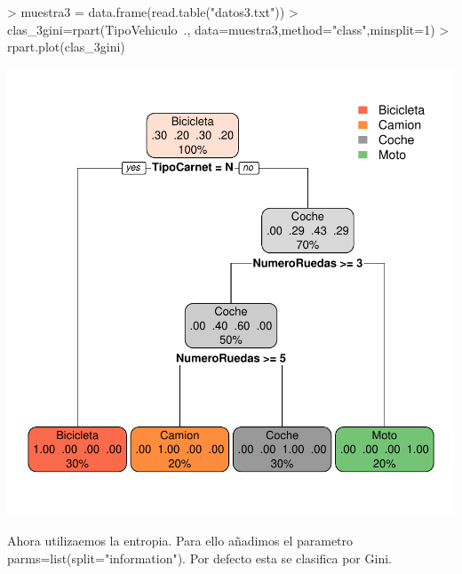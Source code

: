 \documentclass [a4paper] {article}
\begin{document}
\begin{center}
\begin{Schunk}
\begin{Sinput}
> muestra3 = data.frame(read.table("datos3.txt"))
> clas_3gini=rpart(TipoVehiculo~., data=muestra3,method="class",minsplit=1)
> rpart.plot(clas_3gini)
\end{Sinput}
\end{Schunk}
\includegraphics{entrega2-rpart3_gini}
\end{center}

Ahora utilizaemos la entropia. 
Para ello añadimos el parametro parms=list(split="information").
Por defecto esta se clasifica por Gini.
\end{document}
